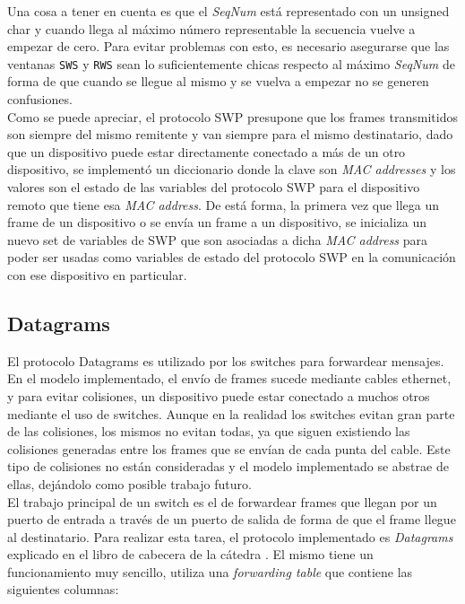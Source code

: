 \documentclass[10pt,a4paper]{article}
\begin{document}
Una cosa a tener en cuenta es que el \textit{SeqNum} está representado con un unsigned char y cuando llega al máximo número representable la secuencia vuelve a empezar de cero. Para evitar problemas con esto, es necesario asegurarse que las ventanas \texttt{SWS} y \texttt{RWS} sean lo suficientemente chicas respecto al máximo \textit{SeqNum} de forma de que cuando se llegue al mismo y se vuelva a empezar no se generen confusiones. \\

Como se puede apreciar, el protocolo SWP presupone que los frames transmitidos son siempre del mismo remitente y van siempre para el mismo destinatario, dado que un dispositivo puede estar directamente conectado a más de un otro dispositivo, se implementó un diccionario donde la clave son \textit{MAC addresses} y los valores son el estado de las variables del protocolo SWP para el dispositivo remoto que tiene esa \textit{MAC address}. De está forma, la primera vez que llega un frame de un dispositivo o se envía un frame a un dispositivo, se inicializa un nuevo set de variables de SWP que son asociadas a dicha \textit{MAC address} para poder ser usadas como variables de estado del protocolo SWP en la comunicación con ese dispositivo en particular.

\subsection{Datagrams}
El protocolo Datagrams es utilizado por los switches para forwardear mensajes. \\

En el modelo implementado, el envío de frames sucede mediante cables ethernet, y para evitar colisiones, un dispositivo puede estar conectado a muchos otros mediante el uso de switches. Aunque en la realidad los switches evitan gran parte de las colisiones, los mismos no evitan todas, ya que siguen existiendo las colisiones generadas entre los frames que se envían de cada punta del cable. Este tipo de colisiones no están consideradas y el modelo implementado se abstrae de ellas, dejándolo como posible trabajo futuro. \\

El trabajo principal de un switch es el de forwardear frames que llegan por un puerto de entrada a través de un puerto de salida de forma de que el frame llegue al destinatario. Para realizar esta tarea, el protocolo implementado es \textit{Datagrams} explicado en el libro de cabecera de la cátedra \cite[p.~172]{peterson2011computer}. El mismo tiene un funcionamiento muy sencillo, utiliza una \textit{forwarding table} que contiene las siguientes columnas: \\
\end{document}
